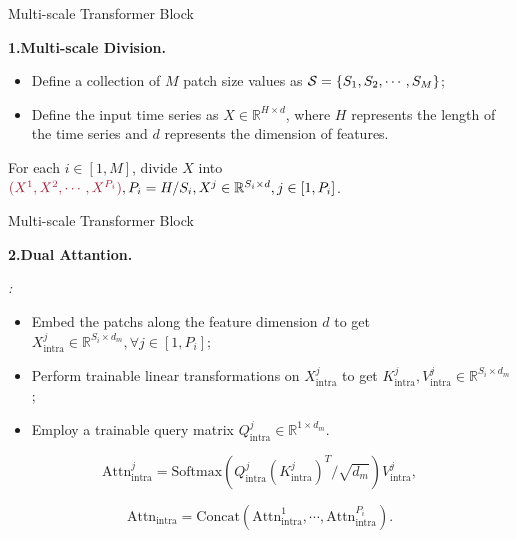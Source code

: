 \documentclass[12pt,aspectratio=169]{beamer}
\begin{document}
\begin{frame}{Multi-scale Transformer Block}

  \textbf{1.Multi-scale Division.}

  \begin{itemize}

    \item Define a collection of $M$ patch size values as 
    ${\cal S}=\{S_1,S_2,\cdots,S_M\}$;
    \item Define the input time series as $X\in\mathbb{R}^{H\times d}$, 
    where $H$ represents the length of the time series and $d$ represents 
    the dimension of features.

  \end{itemize}

  For each $i\in[1,M]$, divide $X$ into ${\color{ECNURed}(X^1,X^2,\cdots,X^{P_i})},
  P_i=H/S_i,X^j\in\mathbb{R}^{S_i\times d},\allowbreak j\in[1,P_i]$.

\end{frame}

\begin{frame}{Multi-scale Transformer Block}

  \textbf{2.Dual Attantion.}

  \textit{\color{ECNURed}{Intra-patch Attantion}:}

  \begin{itemize}

    \item Embed the patchs along the feature dimension $d$ to get 
    $X_\mathrm{intra}^j\in\mathbb{R}^{S_i\times d_m},\allowbreak\forall j\in[1,P_i]$;
  
    \item Perform trainable linear transformations on $X_\mathrm{intra}^j$ to get 
    $K_\mathrm{intra}^j,V_\mathrm{intra}^j\in\mathbb{R}^{S_i\times d_m}$;
  
    \item Employ a trainable query matrix 
    $Q_\mathrm{intra}^j\in\mathbb{R}^{1\times d_m}$.

  \end{itemize}

  \vspace{-0.5cm}
  
  $$\mathrm{Attn}_\mathrm{intra}^j=\mathrm{Softmax}\left(Q_\mathrm{intra}^j(K_\mathrm{intra}^j)^T/\sqrt{d_m}\right)V_\mathrm{intra}^j,$$

  \vspace{-0.5cm}

  {\color{ECNURed}

    $$\mathrm{Attn}_\mathrm{intra}=\mathrm{Concat}\left(\mathrm{Attn}_\mathrm{intra}^1,\cdots,\mathrm{Attn}_\mathrm{intra}^{P_i}\right).$$
  
  }

\end{frame}
\end{document}
